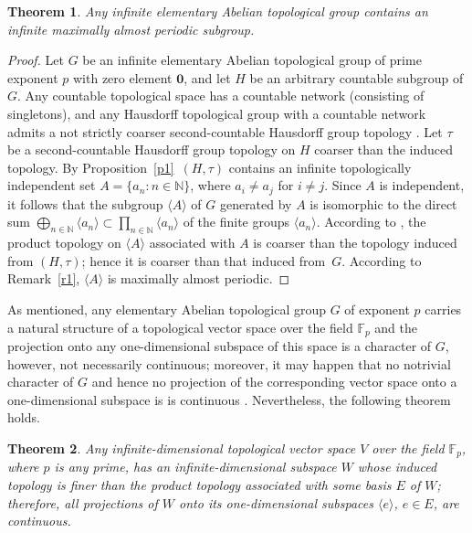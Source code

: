 \documentclass[12pt,a4paper]{amsart}
\newtheorem{theorem}{Theorem}
\theoremstyle{definition}
\newcommand{\zero}{{\mathbf 0}}
\begin{document}
\begin{theorem}
\label{t1}
Any infinite elementary Abelian topological group contains an infinite maximally almost periodic subgroup. 
\end{theorem}

\begin{proof}
Let $G$ be an infinite elementary Abelian topological group of prime exponent $p$ with zero element $\zero$, 
and let $H$ be 
an arbitrary countable subgroup of $G$. Any countable topological space has a countable network (consisting of 
singletons), and 
any Hausdorff topological group with a countable network admits a not strictly coarser second-countable Hausdorff group 
topology \cite[Theorem~2]{Arhangelskii79}. Let $\tau$ be a second-countable Hausdorff group topology on $H$ 
coarser than the induced topology. By Proposition~\ref{p1} \,$(H,\tau)$ contains an infinite topologically 
independent set $A=\{a_n: n\in \mathbb N\}$, where $a_i\ne a_j$ for $i\ne j$. Since $A$ is independent, it 
follows that the subgroup $\langle A\rangle$ of $G$ generated by $A$ is isomorphic to the direct sum 
$\bigoplus_{n\in \mathbb N} \langle a_n\rangle\subset \prod_{n\in \mathbb N}\langle a_n\rangle$ of the finite 
groups $\langle a_n\rangle$. According to \cite[Proposition~4.7]{DSS}, the product topology on $\langle A\rangle$ 
associated with $A$ is coarser than the topology induced from $(H,\tau)$; hence it is coarser than that induced 
from~$G$. According to Remark~\ref{r1}, $\langle A\rangle$ is maximally almost periodic. 
\end{proof}

As mentioned, any elementary Abelian topological group $G$ of exponent $p$ carries a natural structure of a 
topological vector space over the field $\mathbb F_p$ and the projection onto any one-dimensional subspace 
of this space is a character of $G$, however, not necessarily continuous; moreover, it may happen that 
no notrivial character of $G$ and hence no projection of the corresponding vector space onto a one-dimensional 
subspace is is continuous \cite[Example~5]{ZP}. Nevertheless, the following theorem holds. 

\begin{theorem}
\label{t2}
Any infinite-dimensional topological vector space $V$ over the field $\mathbb F_p$, where $p$ is any prime, has 
an infinite-dimensional subspace $W$ whose induced topology is finer than the product topology associated with 
some basis $E$ of $W$; therefore, all projections of $W$ onto its one-dimensional subspaces $\langle e\rangle$, 
$e\in E$, are continuous. 
\end{theorem}
\end{document}
